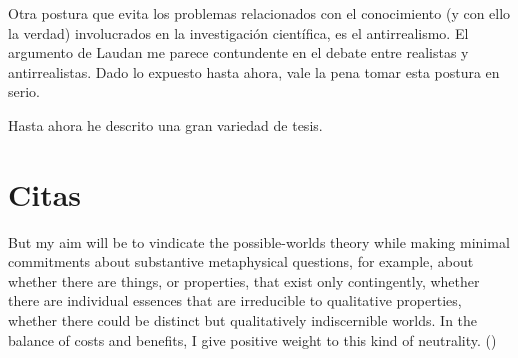 


Otra postura que evita los problemas relacionados con el conocimiento (y con ello la verdad) involucrados en la investigación científica, es el antirrealismo. El argumento de Laudan me parece contundente en el debate entre realistas y antirrealistas. Dado lo expuesto hasta ahora, vale la pena tomar esta postura en serio.

Hasta ahora he descrito una gran variedad de tesis. 


\section{Citas}

But my aim will be to vindicate the possible-worlds theory while making minimal commitments about substantive metaphysical questions, for example, about whether there are things, or properties, that exist only contingently, whether there are individual essences that are irreducible to qualitative properties, whether there could be distinct but qualitatively indiscernible worlds. In the balance of costs and benefits, I give positive weight to this kind of neutrality. (\cite{stalnaker2012})

